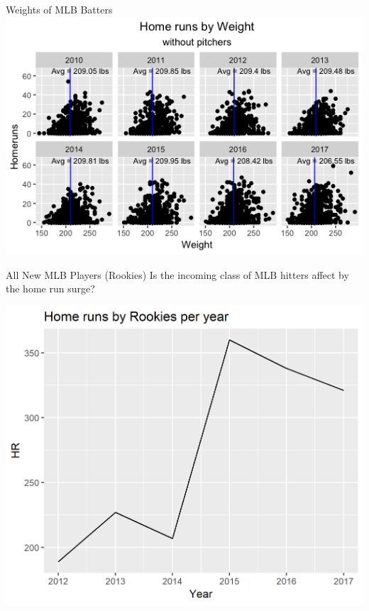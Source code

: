 \documentclass[14pt]{bredelebeamer}
\begin{document}
\begin{frame}{Weights of MLB Batters }
	\centering
    	\includegraphics[scale = 0.55]{Graphs/weightnopitch.png}
    
\end{frame}

\begin{frame}{All New MLB Players (Rookies)}
Is the incoming class of MLB hitters affect by the home run surge?
	\begin{center}
    	\includegraphics[scale = 0.5]{Graphs/rookie_hrs.png}
    \end{center}
\end{frame}
\end{document}
